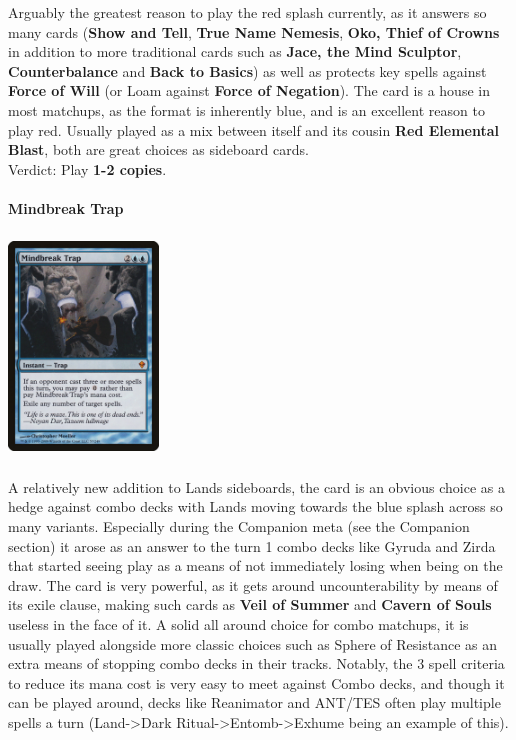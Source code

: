 \documentclass{report}
\begin{document}
Arguably the greatest reason to play the red splash currently, as it answers so many cards (\textbf{Show and Tell}, \textbf{True Name Nemesis}, \textbf{Oko, Thief of Crowns} in addition to more traditional cards such as \textbf{Jace, the Mind Sculptor}, \textbf{Counterbalance} and \textbf{Back to Basics}) as well as protects key spells against \textbf{Force of Will} (or Loam against \textbf{Force of Negation}). The card is a house in most matchups, as the format is inherently blue, and is an excellent reason to play red. Usually played as a mix between itself and its cousin \textbf{Red Elemental Blast}, both are great choices as sideboard cards.\\
Verdict:  Play \textbf{1-2 copies}.\\\\
\newpage
\textbf{Mindbreak Trap}
\begin{center}
\includegraphics [width = 4cm, height = 6cm] {mindbreak-trap}
\end{center}
A relatively new addition to Lands sideboards, the card is an obvious choice as a hedge against combo decks with Lands moving towards the blue splash across so many variants. Especially during the Companion meta (see the Companion section) it arose as an answer to the turn 1 combo decks like Gyruda and Zirda that started seeing play as a means of not immediately losing when being on the draw. The card is very powerful, as it gets around uncounterability by means of its exile clause, making such cards as \textbf{Veil of Summer} and \textbf{Cavern of Souls} useless in the face of it. A solid all around choice for combo matchups, it is usually played alongside more classic choices such as Sphere of Resistance as an extra means of stopping combo decks in their tracks. Notably, the 3 spell criteria to reduce its mana cost is very easy to meet against Combo decks, and though it can be played around, decks like Reanimator and ANT/TES often play multiple spells a turn (Land->Dark Ritual->Entomb->Exhume being an example of this).\\
\end{document}
